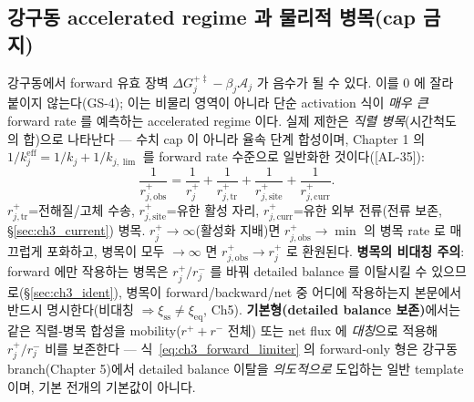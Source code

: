 \documentclass[11pt,a4paper]{article}
\newcommand{\eff}{\mathrm{eff}}
\newcommand{\eq}{\mathrm{eq}}
\newcommand{\sstat}{\mathrm{ss}}
\newcommand{\obs}{\mathrm{obs}}
\newcommand{\trans}{\mathrm{tr}}
\newcommand{\site}{\mathrm{site}}
\newcommand{\curr}{\mathrm{curr}}
\newcommand{\AL}[1]{\textsf{[AL-#1]}}
\begin{document}
\subsection{강구동 accelerated regime 과 물리적 병목(cap 금지)}\label{sec:ch3_limiter}
강구동에서 forward 유효 장벽 $\Delta G_j^{+\ddagger}-\beta_j\mathcal A_j$ 가 음수가 될 수 있다. 이를 $0$ 에 잘라
붙이지 않는다(GS-4); 이는 비물리 영역이 아니라 단순 activation 식이 \emph{매우 큰} forward rate 를 예측하는
accelerated regime 이다. 실제 제한은 \emph{직렬 병목}(시간척도의 합)으로 나타난다 — 수치 cap 이 아니라 율속
단계 합성이며, Chapter 1 의 $1/k_j^{\eff}=1/k_j+1/k_{j,\lim}$ 를 forward rate 수준으로 일반화한 것이다(\AL{35}):
\begin{equation}
\frac{1}{r_{j,\obs}^+}=\frac{1}{r_j^+}+\frac{1}{r_{j,\trans}^+}+\frac{1}{r_{j,\site}^+}+\frac{1}{r_{j,\curr}^+}.
\label{eq:ch3_forward_limiter}
\end{equation}
$r_{j,\trans}^+$=전해질/고체 수송, $r_{j,\site}^+$=유한 활성 자리, $r_{j,\curr}^+$=유한 외부 전류(전류 보존,
\S\ref{sec:ch3_current}) 병목. $r_j^+\to\infty$(활성화 지배)면 $r_{j,\obs}^+\to\min$ 의 병목 rate 로 매끄럽게
포화하고, 병목이 모두 $\to\infty$ 면 $r_{j,\obs}^+\to r_j^+$ 로 환원된다. \textbf{병목의 비대칭 주의}: forward
에만 작용하는 병목은 $r_j^+/r_j^-$ 를 바꿔 detailed balance 를 이탈시킬 수 있으므로(\S\ref{sec:ch3_ident}),
병목이 forward/backward/net 중 어디에 작용하는지 본문에서 반드시 명시한다(비대칭 $\Rightarrow\xi_{\sstat}\ne\xi_{\eq}$, Ch5).
\textbf{기본형(detailed balance 보존)}에서는 같은 직렬-병목 합성을 mobility($r^++r^-$ 전체) 또는 net flux 에
\emph{대칭}으로 적용해 $r_j^+/r_j^-$ 비를 보존한다 — 식~\eqref{eq:ch3_forward_limiter} 의 forward-only 형은 강구동
branch(Chapter 5)에서 detailed balance 이탈을 \emph{의도적으로} 도입하는 일반 template 이며, 기본 전개의 기본값이
아니다.
\end{document}
